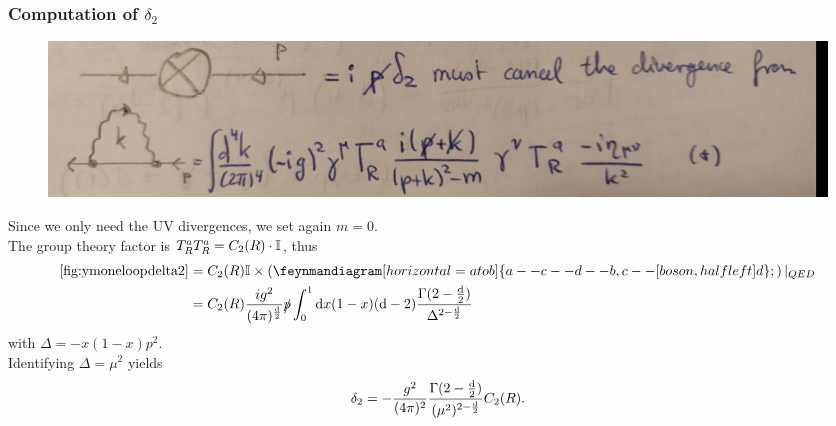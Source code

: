 \subsubsection{Computation of $\delta_2$}

\begin{figure}[h!]
	\centering
	\includegraphics[width=0.7\linewidth]{gfx/YMpictures/YMoneLoopDelta2}
	\caption{}
	\label{fig:ymoneloopdelta2}
\end{figure}
Since we only need the UV divergences, we set again $m=0$.
\\The group theory factor is $T^a_R T^a_R = C_2(R) \cdot \mathbb{I}$, thus
\begin{align}
	\ref{fig:ymoneloopdelta2} &= C_2(R)\mI  \times \left(\feynmandiagram[horizontal=a to b]{a--c--d--b, c--[boson, half left]d};\right)|_{QED} \\
	&= C_2(R) \frac{i g^2}{(4 \pi)^{\frac{\md}{2}} } \slashed{p} \int_0^1 \md x (1-x)(\md -2 ) \frac{\Gamma(2-\frac{\md}{2})}{\Delta^{2-\frac{\md}{2}}}
\end{align}
with $\Delta=-x(1-x)p^2$.\\ 
Identifying $\Delta=\mu^2$ yields
\begin{equation}
\delta_2 = - \frac{g^2}{(4 \pi)^2} \frac{\Gamma(2-\frac{\mathrm{d}}{2})}{(\mu^2)^{2-\frac{\mathrm{d}}{2}} } C_2(R).
\end{equation}



